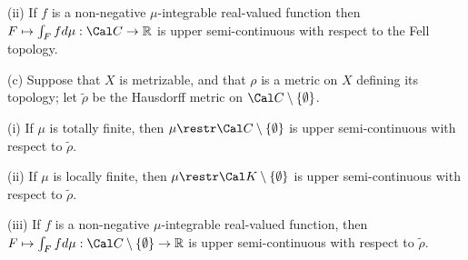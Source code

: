 \quad(ii) If $f$ is a non-negative $\mu$-integrable real-valued function
then $F\mapsto\int_Ffd\mu:\Cal C\to\Bbb R$ is upper semi-continuous with
respect to the Fell topology.

(c) Suppose that $X$ is metrizable, and that $\rho$ is a metric on $X$
defining its topology;  let $\tilde\rho$ be the Hausdorff metric on
$\Cal C\setminus\{\emptyset\}$.

\quad(i) If $\mu$ is totally finite, then
$\mu\restr\Cal C\setminus\{\emptyset\}$ is upper semi-continuous with
respect to $\tilde\rho$.

\quad(ii) If $\mu$ is locally finite, then
$\mu\restr\Cal K\setminus\{\emptyset\}$ is upper semi-continuous with
respect to $\tilde\rho$.

\quad(iii) If $f$ is a non-negative
$\mu$-integrable real-valued function, then
$F\mapsto\int_Ffd\mu:\Cal C\setminus\{\emptyset\}\to\Bbb R$ is upper
semi-continuous with respect to $\tilde\rho$.

